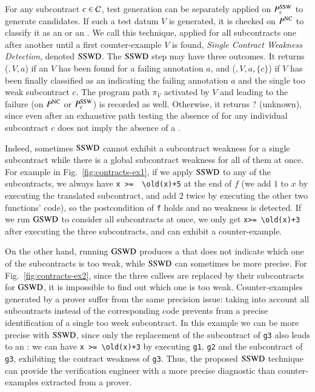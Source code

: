 For any subcontract $c\in{\ensuremath\mathcal{C}}$, test generation can be separately applied on  $P_{c}^{\mathrm{SSW}}$ to generate
\SSWCE candidates. If such a test datum $V$ is generated, it is checked on $P^{\mathrm{NC}}$ to 
classify it as an \NCCE or an \SSWCE.
We call this technique,
applied for all subcontracts one after another until a first counter-example  $V$ is found,  
\emph{Single Contract Weakness Detection,}
denoted $\mathrm{SSWD}$. 
The $\mathrm{SSWD}$ step may have three outcomes.
It returns (\nc,\,$V$,\,$a$) if an \NCCE $V$ has been found for a failing annotation $a$,
and  (\cw,\,$V$,\,$a$,\,$\{c\}$) if $V$ has been finally classified as an \SSWCE
indicating the failing annotation $a$ and the single too weak subcontract $c$.
The program path $\pi_V$ activated by $V$ and leading to the failure 
(on $P^{\mathrm{NC}}$ or $P_c^{\mathrm{SSW}}$) is recorded as well.
Otherwise, it returns \textsf{?} (unknown), since even after an exhaustive path testing
the absence of \SSWCE for any individual subcontract $c$ does not imply
the absence of a \GSWCE.

Indeed, sometimes $\mathrm{SSWD}$ cannot exhibit a subcontract weakness for a single subcontract
while there is a global subcontract weakness for all of them at once.
For example in Fig.~\ref{fig:contracts-ex1},
if we apply $\mathrm{SSWD}$ to any of the subcontracts, we always have
\lstinline'x >=  \old(x)+5' at the end of $f$
(we add $1$ to $x$ by executing the translated subcontract,
and add $2$ twice by executing the other two functions' code),
so the postcondition of \lstinline'f' holds and no weakness is detected.
If we run  $\mathrm{GSWD}$  to consider all subcontracts at once, we only get
\lstinline'x>= \old(x)+3' after executing the three subcontracts, and can exhibit a counter-example.

On the other hand, running  $\mathrm{GSWD}$
produces a \GSWCE that does not indicate which one of the subcontracts is too weak,
while $\mathrm{SSWD}$ can sometimes be more precise.
For Fig.~\ref{fig:contracts-ex2},
since the three callees are replaced by their subcontracts for  $\mathrm{GSWD}$,  it is impossible
to find out which one is too weak.
Counter-examples generated by a prover suffer from the same precision issue:
taking into account all subcontracts instead of the corresponding code 
prevents from a precise identification of a single too week subcontract.
In this example we can be more precise with $\mathrm{SSWD}$,
since only the replacement of the  subcontract of  \lstinline'g3' also leads to an \SSWCE:
we can have \lstinline'x >= \old(x)+3' by executing
\lstinline'g1',  \lstinline'g2' and the subcontract of \lstinline'g3',
exhibiting the contract weakness of \lstinline'g3'.
Thus, the proposed $\mathrm{SSWD}$  technique can provide the verification engineer
with a more precise diagnostic than counter-examples extracted from a prover.

